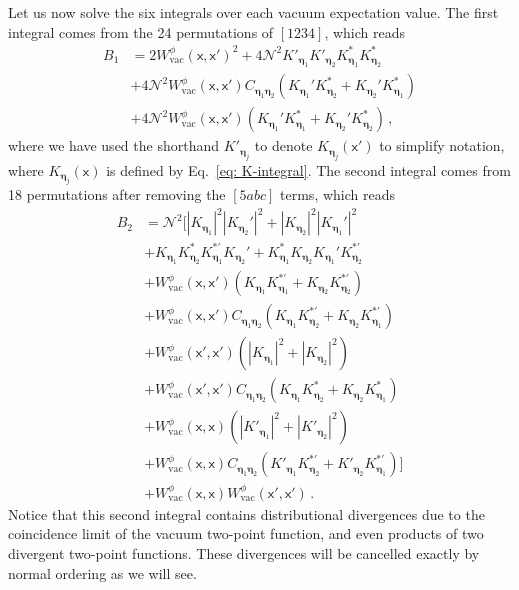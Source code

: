 \documentclass[prd,twocolumn,superscriptaddress,nofootinbib,floatfix,amsmath,amssymb]{revtex4-2}
\newcommand{\sx}{\mathsf{x}}
\newcommand{\spec}{C_{\ba\bb}}
\newcommand{\NN}{\mathcal{N}}
\newcommand{\rr}[1]{\left(#1\right)}
\newcommand{\ba}{{\bm{\eta}_1}}
\newcommand{\bb}{{\bm{\eta}_2}}
\newcommand{\norm}[1]{||#1||}
\newcommand{\tcb}[1]{\leavevmode{\color{blue}{#1}}}
\newcommand{\vac}{\text{vac}}
\newcommand{\bc}{{\bm{\eta}}}
\begin{document}
    Let us now solve the six integrals over each vacuum expectation value. The first integral comes from the 24 permutations of $[1234]$, which reads
    \begin{equation}
    \begin{split}
        B_1 &= 2W^\phi_{\vac}(\sx,\sx')^2%
        + 4{\NN}^2K'_\ba K'_\bb K^*_\ba K^*_\bb  \\
        &+ 4{\NN}^2W_{\vac}^\phi(\sx,\sx')\spec\rr{K_\ba'K^*_\bb +K_\bb'K^*_\ba } \\
        &+ 4{\NN}^2W_{\vac}^\phi(\sx,\sx')\rr{K_\ba'K^*_\ba +K_\bb'K^*_\bb }\,,
    \end{split}
    \end{equation}
    where we have used the shorthand $K'_{\bc_j}$ to denote $K_{\bc_j}(\sx')$ to simplify notation, where $K_{\bc_j}(\sx)$ is defined by Eq.~\eqref{eq: K-integral}.
    The second integral comes from 18 permutations after removing the $[5abc]$ terms, which reads
    \begin{equation}
        \begin{split}
        B_2 &= {\NN}^2\bigg[|K_\ba|^2|K_\bb'|^2 + |K_\bb|^2|K_\ba'|^2  \\
        &+
        K_\ba K_\bb^*K_\ba^{*'} K_\bb' +  K_\ba^* K_\bb K_\ba' K_\bb^{*'} \\
        &+
        W_{\vac}^\phi(\sx,\sx')\rr{K_\ba {K}^{*'}_\ba + K_\bb {K}^{*'}_\bb } \\
        &+
        W_{\vac}^\phi(\sx,\sx')\spec\rr{K_\ba {K}^{*'}_\bb + K_\bb {K}^{*'}_\ba }  \\
        &+
        W_{\vac}^\phi(\sx',\sx')\rr{|K_\ba|^2 + |K_\bb|^2 }  \\
        &+
        W_{\vac}^\phi(\sx',\sx')\spec\rr{K_\ba K^*_\bb + K_\bb K^{*}_\ba }  \\
        &+
        W_{\vac}^\phi(\sx,\sx)\rr{|K'_\ba|^2 + |K'_\bb|^2 }  \\
        &+
        W_{\vac}^\phi(\sx,\sx)\spec\rr{K'_\ba {K}^{*'}_\bb + K'_\bb {K}^{*'}_\ba } \bigg]\\
        &+
        W_{\vac}^\phi(\sx,\sx)W_{\vac}^\phi(\sx',\sx')\,.%
        \end{split}
    \end{equation}
    Notice that this second integral contains distributional divergences due to the coincidence limit of the vacuum two-point function, and even products of two divergent two-point functions. These divergences will be cancelled exactly by normal ordering as we will see. 
    
\end{document}
